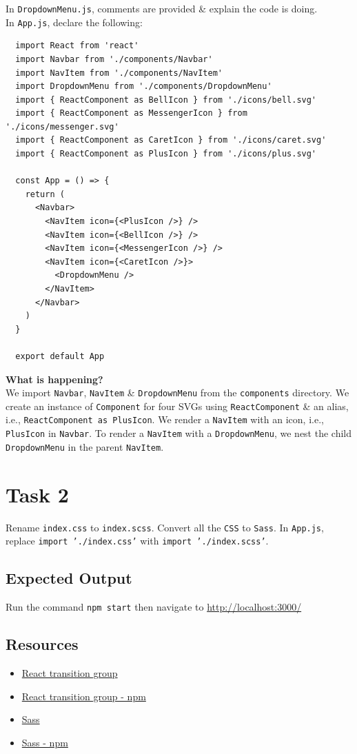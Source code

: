 \documentclass{article}
\begin{document}
In \texttt{DropdownMenu.js}, comments are provided \& explain the code is doing. \\

In \texttt{App.js}, declare the following:
\begin{verbatim}
  import React from 'react'
  import Navbar from './components/Navbar'
  import NavItem from './components/NavItem'
  import DropdownMenu from './components/DropdownMenu'
  import { ReactComponent as BellIcon } from './icons/bell.svg'
  import { ReactComponent as MessengerIcon } from './icons/messenger.svg'
  import { ReactComponent as CaretIcon } from './icons/caret.svg'
  import { ReactComponent as PlusIcon } from './icons/plus.svg'

  const App = () => {
    return (
      <Navbar>
        <NavItem icon={<PlusIcon />} />
        <NavItem icon={<BellIcon />} />
        <NavItem icon={<MessengerIcon />} />
        <NavItem icon={<CaretIcon />}>
          <DropdownMenu />
        </NavItem>
      </Navbar>
    )
  }

  export default App
\end{verbatim}

\textbf{What is happening?} \\
We import \texttt{Navbar}, \texttt{NavItem} \& \texttt{DropdownMenu} from the \texttt{components} directory. We create an instance of \texttt{Component} for four SVGs using \texttt{ReactComponent} \& an alias, i.e., \texttt{ReactComponent as PlusIcon}. We render a \texttt{NavItem} with an icon, i.e., \texttt{PlusIcon} in \texttt{Navbar}. To render a \texttt{NavItem} with a \texttt{DropdownMenu}, we nest the child \texttt{DropdownMenu} in the parent \texttt{NavItem}.

\section*{Task 2} 
Rename \texttt{index.css} to \texttt{index.scss}. Convert all the \texttt{CSS} to \texttt{Sass}. In \texttt{App.js}, replace \texttt{import './index.css'} with \texttt{import './index.scss'}.

\subsection*{Expected Output} 
Run the command \texttt{npm start} then navigate to \href{http://localhost:3000/}{http://localhost:3000/} \\

\subsection*{Resources} 
\begin{itemize}
  \item \href{https://reactcommunity.org/react-transition-group/}{React transition group}
  \item \href{https://www.npmjs.com/package/react-transition-group/}{React transition group - npm}
  \item \href{https://sass-lang.com/}{Sass}
  \item \href{https://www.npmjs.com/package/sass/}{Sass - npm}
\end{itemize}
 
\end{document}
